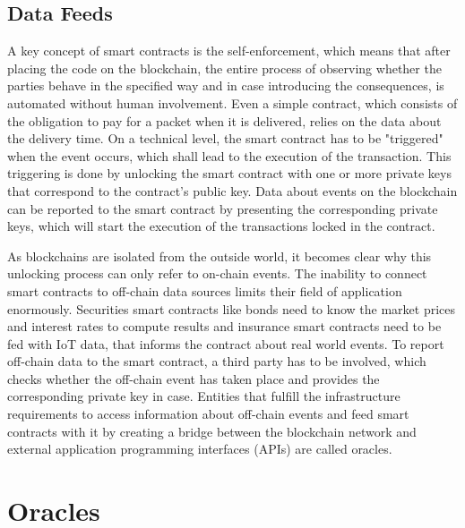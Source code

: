 \documentclass[conference]{IEEEtran}
\begin{document}
\subsection{Data Feeds}
A key concept of smart contracts is the self-enforcement, which means that after placing the code on the blockchain, the entire process of observing whether the parties behave in the specified way and in case introducing the consequences, is automated without human involvement. Even a simple contract, which consists of the obligation to pay for a packet when it is delivered, relies on the data about the delivery time. On a technical level, the smart contract has to be "triggered" when the event occurs, which shall lead to the execution of the transaction. This triggering is done by unlocking the smart contract with one or more private keys that correspond to the contract's public key. Data about events on the blockchain can be reported to the smart contract by presenting the corresponding private keys, which will start the execution of the transactions locked in the contract. \cite{Mik2017} \par
As blockchains are isolated from the outside world, it becomes clear why this unlocking process can only refer to on-chain events. The inability to connect smart contracts to off-chain data sources limits their field of application enormously. Securities smart contracts like bonds need to know the market prices and interest rates to compute results and insurance smart contracts need to be fed with IoT data, that informs the contract about real world events. To report off-chain data to the smart contract, a third party has to be involved, which checks whether the off-chain event has taken place and provides the corresponding private key in case. Entities that fulfill the infrastructure requirements to access information about off-chain events and feed smart contracts with it by creating a bridge between the blockchain network and external application programming interfaces (APIs) are called oracles. \cite{Mik2017} \cite{Ellis2017} \cite{Thomas2014} \par  
 
\section{Oracles}
\end{document}
